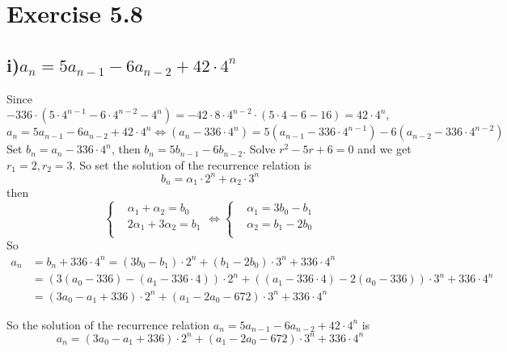 \documentclass[a4paper,12pt,titlepage]{article}
\begin{document}
\section*{Exercise 5.8}
\subsection*{i)$a_n=5a_{n-1}-6a_{n-2}+42\cdot 4^n$}
Since $-336\cdot(5\cdot 4^{n-1}-6\cdot 4^{n-2}-4^n)=-42\cdot 8\cdot4^{n-2}\cdot(5\cdot 4-6-16)=42\cdot 4^n$, 
$$a_n=5a_{n-1}-6a_{n-2}+42\cdot 4^n\Leftrightarrow (a_n-336\cdot 4^n)=5(a_{n-1}-336\cdot 4^{n-1})-6(a_{n-2}-336\cdot 4^{n-2})$$
Set $b_n=a_n-336\cdot 4^n$, then $b_n=5b_{n-1}-6b_{n-2}$. Solve $r^2-5r+6=0$ and we get $r_1=2,r_2=3$. So set the solution of the recurrence relation is
$$b_n=\alpha_1 \cdot 2^n+\alpha_2\cdot3^n$$
then
$$\left\{
\begin{aligned}
&\alpha_1+\alpha_2=b_0\\
&2\alpha_1+3\alpha_2=b_1\\
\end{aligned}
\right.\Leftrightarrow \left\{
\begin{aligned}
&\alpha_1=3b_0-b_1\\
&\alpha_2=b_1-2b_0\\
\end{aligned}
\right. $$	
So 
\begin{align*}
a_n&=b_n+336\cdot 4^n=(3b_0-b_1)\cdot 2^n+(b_1-2b_0)\cdot3^n+336\cdot 4^n\\
&=(3(a_0-336)-(a_1-336\cdot4))\cdot 2^n+((a_1-336\cdot4)-2(a_0-336))\cdot3^n+336\cdot 4^n\\
&=(3a_0-a_1+336)\cdot 2^n+(a_1-2a_0-672)\cdot3^n+336\cdot 4^n
\end{align*}

So the solution of the recurrence relation $a_n=5a_{n-1}-6a_{n-2}+42\cdot 4^n$ is
$$a_n=(3a_0-a_1+336)\cdot 2^n+(a_1-2a_0-672)\cdot3^n+336\cdot 4^n$$
\end{document}

